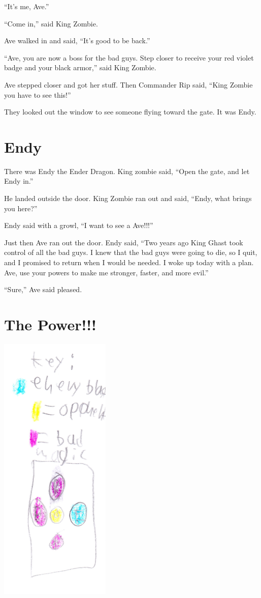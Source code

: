 \documentclass[letterpaper, oneside, 12pt]{krantz}
\begin{document}
``It's me, Ave.''

``Come in,'' said King Zombie.

Ave walked in and said, ``It's good to be back.''

``Ave, you are now a boss for the bad guys. Step closer to receive your
red violet badge and your black armor,'' said King Zombie.

Ave stepped closer and got her stuff. Then Commander Rip said, ``King
Zombie you have to see this!''

They looked out the window to see someone flying toward the gate. It was
Endy.

\hypertarget{endy}{%
\section{Endy}\label{endy}}

There was Endy the Ender Dragon. King zombie said, ``Open the gate, and
let Endy in.''

He landed outside the door. King Zombie ran out and said, ``Endy, what
brings you here?''

Endy said with a growl, ``I want to see a Ave!!!''

Just then Ave ran out the door. Endy said, ``Two years ago King Ghast
took control of all the bad guys. I knew that the bad guys were going to
die, so I quit, and I promised to return when I would be needed. I woke
up today with a plan. Ave, use your powers to make me stronger, faster,
and more evil.''

``Sure,'' Ave said pleased.

\hypertarget{the-power}{%
\section{The Power!!!}\label{the-power}}

\includegraphics[width=2.08333in,height=\textheight]{img/four-bad-guys/key.jpg}
\end{document}
